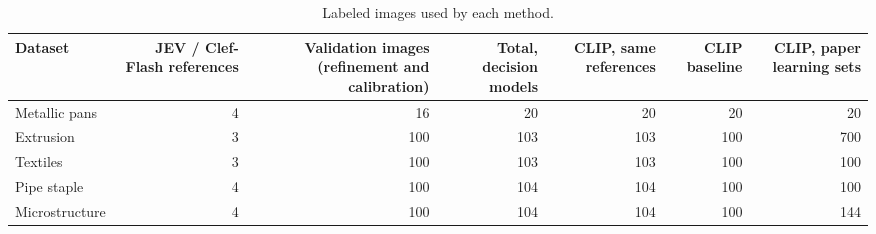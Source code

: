 \begin{table}

\caption{\label{tab:tbl-labels}Labeled images used by each method.}
\centering
\begin{tabular}[t]{lrrrrrr}
\toprule
Dataset & JEV / Clef-Flash references & Validation images (refinement and calibration) & Total, decision models & CLIP, same references & CLIP baseline & CLIP, paper learning sets\\
\midrule
Metallic pans & 4 & 16 & 20 & 20 & 20 & 20\\
Extrusion & 3 & 100 & 103 & 103 & 100 & 700\\
Textiles & 3 & 100 & 103 & 103 & 100 & 100\\
Pipe staple & 4 & 100 & 104 & 104 & 100 & 100\\
Microstructure & 4 & 100 & 104 & 104 & 100 & 144\\
\bottomrule
\end{tabular}
\end{table}
